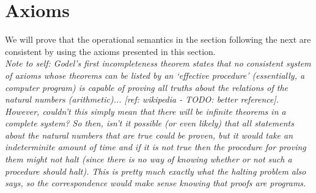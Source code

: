 \documentclass[a4paper,11pt]{article}
\begin{document}
\section{Axioms}

We will prove that the operational semantics in the section following the next are consistent by using the axioms presented in this section.
\\

\emph{Note to self: Godel's first incompleteness theorem states that no consistent system of axioms whose theorems can be listed by an `effective procedure' (essentially, a computer program) is capable of proving all truths about the relations of the natural numbers (arithmetic)... [ref: wikipedia - TODO: better reference].
However, couldn't this simply mean that there will be infinite theorems in a complete system?
So then, isn't it possible (or even likely) that all statements about the natural numbers that are true could be proven, but it would take an indeterminite amount of time and if it is not true then the procedure for proving them might not halt (since there is no way of knowing whether or not such a procedure should halt).
This is pretty much exactly what the halting problem also says, so the correspondence would make sense knowing that proofs are programs.
}
\\
\end{document}
